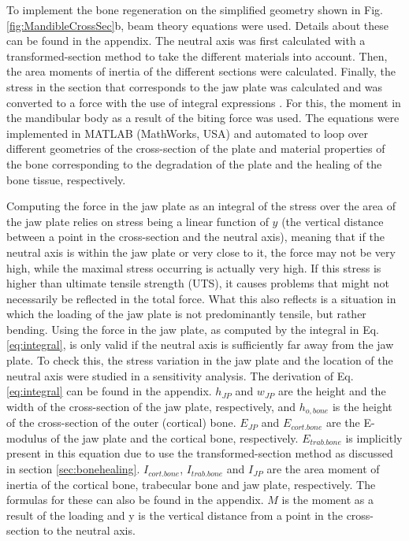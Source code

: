 To implement the bone regeneration on the simplified geometry shown in Fig. \ref{fig:MandibleCrossSec}b, beam theory equations were used. Details about these can be found in the appendix. The neutral axis was first calculated with a transformed-section method to take the different materials into account. Then, the area moments of inertia of the different sections were calculated. Finally, the stress in the section that corresponds to the jaw plate was calculated and was converted to a force with the use of integral expressions \cite{beamtheory}. For this, the moment in the mandibular body as a result of the biting force was used. The equations were implemented in MATLAB (MathWorks, USA) and automated to loop over different geometries of the cross-section of the plate and material properties of the bone corresponding to the degradation of the plate and the healing of the bone tissue, respectively.


Computing the force in the jaw plate as an integral of the stress over the area of the jaw plate relies on stress being a linear function of $y$ (the vertical distance between a point in the cross-section and the neutral axis), meaning that if the neutral axis is within the jaw plate or very close to it, the force may not be very high, while the maximal stress occurring is actually very high. If this stress is higher than ultimate tensile strength (\gls{UTS}), it causes problems that might not necessarily be reflected in the total force. What this also reflects is a situation in which the loading of the jaw plate is not predominantly tensile, but rather bending. Using the force in the jaw plate, as computed by the integral in Eq. \ref{eq:integral}, is only valid if the neutral axis is sufficiently far away from the jaw plate. To check this, the stress variation in the jaw plate and the location of the neutral axis were studied in a sensitivity analysis. The derivation of Eq. \ref{eq:integral} can be found in the appendix. $h_{JP}$ and $w_{JP}$ are the height and the width of the cross-section of the jaw plate, respectively, and $h_{o,bone}$ is the height of the cross-section of the outer (cortical) bone. $E_{JP}$ and $E_{cort.bone}$ are the E-modulus of the jaw plate and the cortical bone, respectively. $E_{trab.bone}$ is implicitly present in this equation due to use the transformed-section method as discussed in section \ref{sec:bonehealing}. $I_{cort.bone}$, $I_{trab.bone}$ and $I_{JP}$ are the area moment of inertia of the cortical bone, trabecular bone and jaw plate, respectively. The formulas for these can also be found in the appendix. $M$ is the moment as a result of the loading and y is the vertical distance from a point in the cross-section to the neutral axis.

